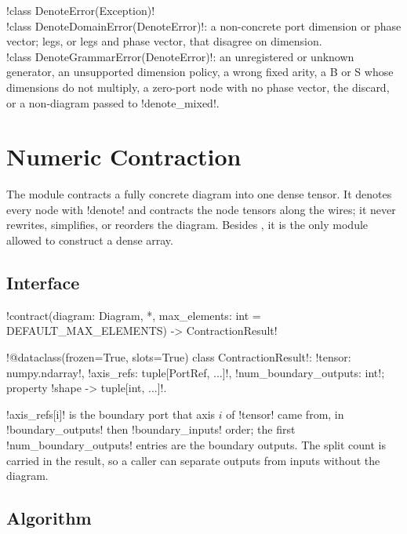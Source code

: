 \begin{signature}
\py!class DenoteError(Exception)!\\
\py!class DenoteDomainError(DenoteError)!: a non-concrete port dimension or phase vector; legs, or legs and phase vector, that disagree on dimension.\\
\py!class DenoteGrammarError(DenoteError)!: an unregistered or unknown generator, an unsupported dimension policy, a wrong fixed arity, a B or S whose dimensions do not multiply, a zero-port node with no phase vector, the discard, or a non-diagram passed to \py!denote_mixed!.
\end{signature}

\section{Numeric Contraction}\label{sec:semantics-numeric}

The module  contracts a fully concrete diagram into one dense tensor. It denotes every node with \py!denote! and contracts the node tensors along the wires; it never rewrites, simplifies, or reorders the diagram. Besides , it is the only module allowed to construct a dense array.

\subsection{Interface}

\begin{signature}
\py!contract(diagram: Diagram, *, max_elements: int = DEFAULT_MAX_ELEMENTS) -> ContractionResult!

\py!@dataclass(frozen=True, slots=True) class ContractionResult!: \py!tensor: numpy.ndarray!, \py!axis_refs: tuple[PortRef, ...]!, \py!num_boundary_outputs: int!; property \py!shape -> tuple[int, ...]!.
\end{signature}

\noindent \py!axis_refs[i]! is the boundary port that axis $i$ of \py!tensor! came from, in \py!boundary_outputs! then \py!boundary_inputs! order; the first \py!num_boundary_outputs! entries are the boundary outputs. The split count is carried in the result, so a caller can separate outputs from inputs without the diagram.

\subsection{Algorithm}

